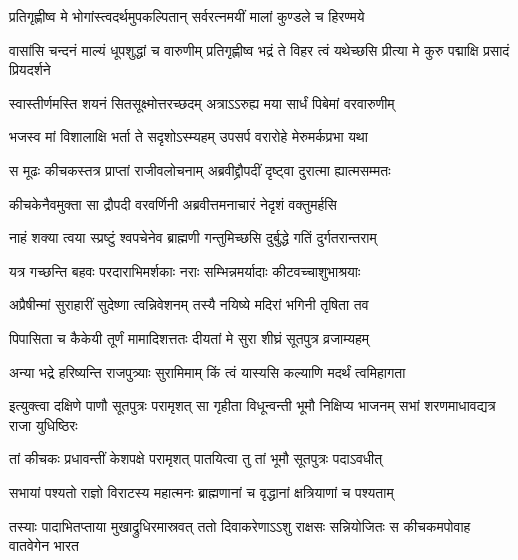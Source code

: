 \twolineshloka
{प्रतिगृह्णीष्व मे भोगांस्त्वदर्थमुपकल्पितान्}
{सर्वरत्नमयीं मालां कुण्डले च हिरण्मये}





\threelineshloka
{वासांसि चन्दनं माल्यं धूपशुद्धां च वारुणीम्}
{प्रतिगृह्णीष्व भद्रं ते विहर त्वं यथेच्छसि}
{प्रीत्या मे कुरु पद्माक्षि प्रसादं प्रियदर्शने}


\twolineshloka
{स्वास्तीर्णमस्ति शयनं सितसूक्ष्मोत्तरच्छदम्}
{अत्राऽऽरुह्य मया सार्धं पिबेमां वरवारुणीम्}


\twolineshloka
{भजस्व मां विशालाक्षि भर्ता ते सदृशोऽस्म्यहम्}
{उपसर्प वरारोहे मेरुमर्कप्रभा यथा}



\twolineshloka
{स मूढः कीचकस्तत्र प्राप्तां राजीवलोचनाम्}
{अब्रवीद्द्रौपदीं दृष्ट्वा दुरात्मा ह्यात्मसम्मतः}


\twolineshloka
{कीचकेनैवमुक्ता सा द्रौपदी वरवर्णिनी}
{अब्रवीत्तमनाचारं नेदृशं वक्तुमर्हसि}


\twolineshloka
{नाहं शक्या त्वया स्प्रष्टुं श्वपचेनेव ब्राह्मणी}
{गन्तुमिच्छसि दुर्बुद्धे गतिं दुर्गतरान्तराम्}


\twolineshloka
{यत्र गच्छन्ति बहवः परदाराभिमर्शकाः}
{नराः सम्भिन्नमर्यादाः कीटवच्चाशुभाश्रयाः}


\twolineshloka
{अप्रैषीन्मां सुराहारीं सुदेष्णा त्वन्निवेशनम्}
{तस्यै नयिष्ये मदिरां भगिनी तृषिता तव}


\twolineshloka
{पिपासिता च कैकेयी तूर्णं मामादिशत्ततः}
{दीयतां मे सुरा शीघ्रं सूतपुत्र व्रजाम्यहम्}




\twolineshloka
{अन्या भद्रे हरिष्यन्ति राजपुत्र्याः सुरामिमाम्}
{किं त्वं यास्यसि कल्याणि मदर्थं त्वमिहागता}



\threelineshloka
{इत्युक्त्वा दक्षिणे पाणौ सूतपुत्रः परामृशत्}
{सा गृहीता विधून्वन्ती भूमौ निक्षिप्य भाजनम्}
{सभां शरणमाधावद्यत्र राजा युधिष्ठिरः}


\twolineshloka
{तां कीचकः प्रधावन्तीं केशपक्षे परामृशत्}
{पातयित्वा तु तां भूमौ सूतपुत्रः पदाऽवधीत्}


\twolineshloka
{सभायां पश्यतो राज्ञो विराटस्य महात्मनः}
{ब्राह्मणानां च वृद्धानां क्षत्रियाणां च पश्यताम्}


\onelineshloka
{तस्याः पादाभितप्ताया मुखाद्रुधिरमास्रवत्}
\twolineshloka
{ततो दिवाकरेणाऽऽशु राक्षसः सन्नियोजितः}
{स कीचकमपोवाह वातवेगेन भारत}


